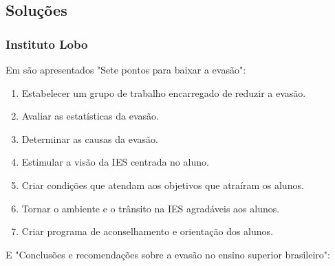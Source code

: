 \documentclass{report}
\begin{document}

\subsection{Soluções}

\subsubsection{Instituto Lobo}

Em \cite{evasao_panorama2} são apresentados "Sete pontos para baixar a evasão":

\begin{enumerate}

\item Estabelecer um grupo de trabalho encarregado de reduzir a evasão.

\item Avaliar as estatísticas da evasão.

\item Determinar as causas da evasão.

\item Estimular a visão da IES centrada no aluno.

\item Criar condições que atendam aos objetivos que atraíram os alunos.

\item Tornar o ambiente e o trânsito na IES agradáveis aos alunos.

\item Criar programa de aconselhamento e orientação dos alunos.

\end{enumerate}

E "Conclusões e recomendações sobre a evasão no ensino superior brasileiro":
\end{document}
